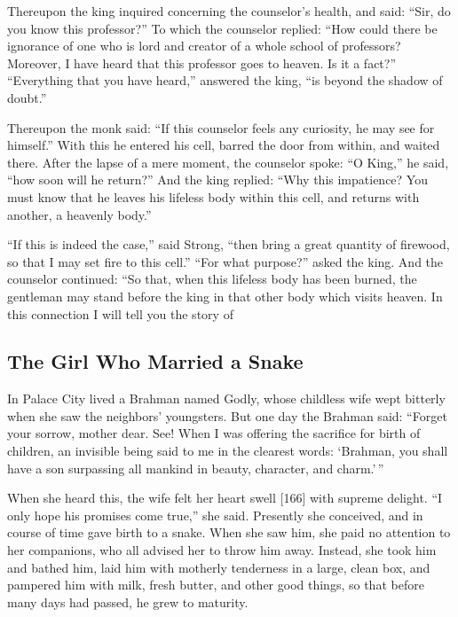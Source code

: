 \documentclass[article, twoside, 14pt]{memoir}
\begin{document}
Thereupon the king inquired concerning the counselor's health, and
said: ``Sir, do you know this professor?'' To which the counselor
replied:
``How could there be ignorance of one who is lord and creator of a whole school of professors? Moreover, I have heard that this professor goes to heaven. Is it a fact?''
``Everything that you have heard,'' answered the king,
``is beyond the shadow of doubt.''

Thereupon the monk said:
``If this counselor feels any curiosity, he may see for himself.''
With this he entered his cell, barred the door from within, and
waited there. After the lapse of a mere moment, the counselor
spoke: ``O King,'' he said, ``how soon will he return?'' And the
king replied:
``Why this impatience? You must know that he leaves his lifeless body within this cell, and returns with another, a heavenly body.''

``If this is indeed the case,'' said Strong,
``then bring a great quantity of firewood, so that I may set fire to this cell.''
``For what purpose?'' asked the king. And the counselor continued:
“So that, when this lifeless body has been burned, the gentleman
may stand before the king in that other body which visits heaven.
In this connection I will tell you the story of

\subsection{The Girl Who Married a Snake}

\label{s26}

In Palace City lived a Brahman named Godly, whose childless wife
wept bitterly when she saw the neighbors' youngsters. But one day
the Brahman said:
``Forget your sorrow, mother dear. See! When I was offering the sacrifice for birth of children, an invisible being said to me in the clearest words: `Brahman, you shall have a son surpassing all mankind in beauty, character, and charm.'\,''

When she heard this, the wife felt her heart swell [166] with
supreme delight. ``I only hope his promises come true,'' she said.
Presently she conceived, and in course of time gave birth to a
snake. When she saw him, she paid no attention to her companions,
who all advised her to throw him away. Instead, she took him and
bathed him, laid him with motherly tenderness in a large, clean
box, and pampered him with milk, fresh butter, and other good
things, so that before many days had passed, he grew to maturity.
\end{document}
